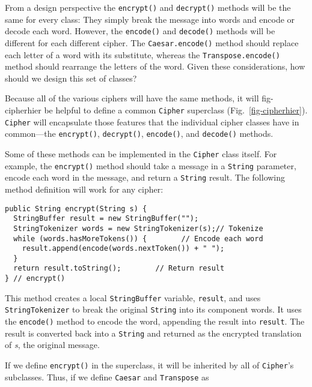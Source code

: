 From a design perspective the {\tt encrypt()} and {\tt decrypt()}
methods will be the same for every class: They simply break the
message into words and encode or decode each word.  However, the
{\tt encode()} and {\tt decode()} methods will be different for each
different cipher.  The {\tt Caesar.encode()} method should replace each
letter of a word with its substitute, whereas the
{\tt Transpose.encode()} method should rearrange the letters of the
word.  Given these considerations, how should we design this set of
classes?

Because all of the various ciphers will have the same methods, it will
{fig-cipherhier}
be helpful to define a common {\tt Cipher} superclass
(Fig.~\ref{fig-cipherhier}).  {\tt Cipher} will encapsulate those
features that the individual cipher classes have in common---the
{\tt encrypt()}, {\tt decrypt()}, {\tt encode()}, and {\tt decode()}
methods.

Some of these methods can be implemented in the {\tt Cipher} class
itself.  For example, the {\tt encrypt()} method should take a message
in a {\tt String} parameter, encode each word in the message, and
return a {\tt String} result.  The following method definition will
work for any cipher:

\begin{jjjlisting}[26.5pc]
\begin{lstlisting}
public String encrypt(String s) {
  StringBuffer result = new StringBuffer("");          
  StringTokenizer words = new StringTokenizer(s);// Tokenize
  while (words.hasMoreTokens()) {        // Encode each word 
    result.append(encode(words.nextToken()) + " "); 
  }
  return result.toString();        // Return result
} // encrypt()
\end{lstlisting}
\end{jjjlisting}

\noindent This method creates a local {\tt StringBuffer} variable,
{\tt result}, and uses {\tt StringTokenizer} to break the original
{\tt String} into its component words.  It uses the {\tt encode()} method to
encode the word, appending the result into {\tt result}. The result is
converted back into a {\tt String} and returned as the encrypted
translation of {\it s}, the original message.

If we define {\tt encrypt()} in the superclass, it will be inherited
by all of {\tt Cipher}'s subclasses.  Thus, if we define {\tt Caesar}
and {\tt Transpose} as

